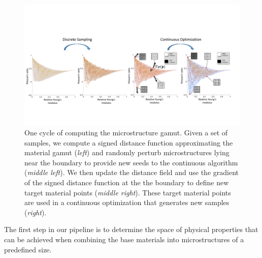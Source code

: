 \begin{figure}[t]
	\centering
	\includegraphics[width=.95\linewidth]{figs/topsampling.pdf}
	\caption{One cycle of computing the microstructure gamut. 
		Given a set of samples, we compute a signed distance function approximating the material gamut (\emph{left}) and randomly perturb microstructures lying near the boundary to provide new seeds to the continuous algorithm (\emph{middle left}). We then update the distance field and use the gradient of the signed distance function at the the boundary to define new target material points (\emph{middle right}). These target material points are used in a continuous optimization that generates new samples (\emph{right}).} 
	\label{fig:lssampling}
\end{figure}

The first step in our pipeline is to determine the space of physical properties that can be achieved when combining the base materials into microstructures of a predefined size.

